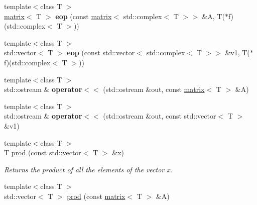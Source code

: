 \begin{DoxyCompactItemize}
\item 
\hypertarget{namespacekeycpp_ae14b016d01024e738c3110299ee58666}{{\footnotesize template$<$class T $>$ }\\\hyperlink{classkeycpp_1_1matrix}{matrix}$<$ T $>$ {\bfseries eop} (const \hyperlink{classkeycpp_1_1matrix}{matrix}$<$ std\-::complex$<$ T $>$$>$ \&A, T($\ast$f)(std\-::complex$<$ T $>$))}\label{namespacekeycpp_ae14b016d01024e738c3110299ee58666}

\item 
\hypertarget{namespacekeycpp_a7f22b23749bd8423cf52448a34280ba4}{{\footnotesize template$<$class T $>$ }\\std\-::vector$<$ T $>$ {\bfseries eop} (const std\-::vector$<$ std\-::complex$<$ T $>$$>$ \&v1, T($\ast$f)(std\-::complex$<$ T $>$))}\label{namespacekeycpp_a7f22b23749bd8423cf52448a34280ba4}

\item 
\hypertarget{namespacekeycpp_a55e8bada51586c0561e1b32ca1ab5f2a}{{\footnotesize template$<$class T $>$ }\\std\-::ostream \& {\bfseries operator$<$$<$} (std\-::ostream \&out, const \hyperlink{classkeycpp_1_1matrix}{matrix}$<$ T $>$ \&A)}\label{namespacekeycpp_a55e8bada51586c0561e1b32ca1ab5f2a}

\item 
\hypertarget{namespacekeycpp_a300d8f6e8992c7b33156492d884bd621}{{\footnotesize template$<$class T $>$ }\\std\-::ostream \& {\bfseries operator$<$$<$} (std\-::ostream \&out, const std\-::vector$<$ T $>$ \&v1)}\label{namespacekeycpp_a300d8f6e8992c7b33156492d884bd621}

\item 
\hypertarget{namespacekeycpp_a5823fd4b932039262a1eddb2f4f47299}{{\footnotesize template$<$class T $>$ }\\T \hyperlink{namespacekeycpp_a5823fd4b932039262a1eddb2f4f47299}{prod} (const std\-::vector$<$ T $>$ \&x)}\label{namespacekeycpp_a5823fd4b932039262a1eddb2f4f47299}

\begin{DoxyCompactList}\small\item\em Returns the product of all the elements of the vector x. \end{DoxyCompactList}\item 
\hypertarget{namespacekeycpp_a9ff26fd7007c28ea88b3ad7cdf90546c}{{\footnotesize template$<$class T $>$ }\\std\-::vector$<$ T $>$ \hyperlink{namespacekeycpp_a9ff26fd7007c28ea88b3ad7cdf90546c}{prod} (const \hyperlink{classkeycpp_1_1matrix}{matrix}$<$ T $>$ \&A)}\label{namespacekeycpp_a9ff26fd7007c28ea88b3ad7cdf90546c}


\end{DoxyCompactItemize}
